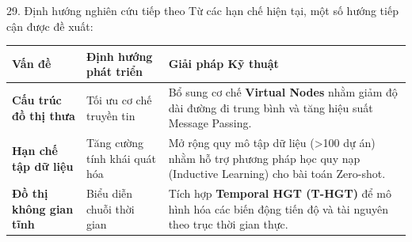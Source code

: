 \begin{frame}{29. Định hướng nghiên cứu tiếp theo}
    Từ các hạn chế hiện tại, một số hướng tiếp cận được đề xuất:
    \vspace{0.2cm}
    \begin{table}
        \centering
        \footnotesize
        \begin{tabular}{@{}llp{6.5cm}@{}}
            \toprule
            \textbf{Vấn đề} & \textbf{Định hướng phát triển} & \textbf{Giải pháp Kỹ thuật} \\
            \midrule
            \textbf{Cấu trúc đồ thị thưa} & Tối ưu cơ chế truyền tin & Bổ sung cơ chế \textbf{Virtual Nodes} nhằm giảm độ dài đường đi trung bình và tăng hiệu suất Message Passing. \\
            \midrule
            \textbf{Hạn chế tập dữ liệu} & Tăng cường tính khái quát hóa & Mở rộng quy mô tập dữ liệu (>100 dự án) nhằm hỗ trợ phương pháp học quy nạp (Inductive Learning) cho bài toán Zero-shot. \\
            \midrule
            \textbf{Đồ thị không gian tĩnh} & Biểu diễn chuỗi thời gian & Tích hợp \textbf{Temporal HGT (T-HGT)} để mô hình hóa các biến động tiến độ và tài nguyên theo trục thời gian thực. \\
            \bottomrule
        \end{tabular}
    \end{table}
\end{frame}
